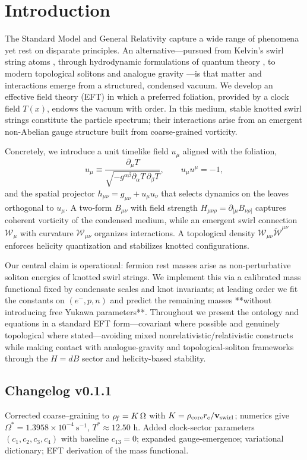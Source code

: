 \section{Introduction}

The Standard Model and General Relativity capture a wide range of phenomena yet rest on disparate principles. An alternative—pursued from Kelvin’s swirl string atoms \cite{Kelvin1867}, through hydrodynamic formulations of quantum theory \cite{Madelung1927}, to modern topological solitons and analogue gravity \cite{Faddeev1997,Arnold1998,Barcelo2011,Volovik2003,Kleckner2013}—is that matter and interactions emerge from a structured, condensed vacuum. We develop an effective field theory (EFT) in which a preferred foliation, provided by a clock field \(T(x)\), endows the vacuum with order. In this medium, stable knotted swirl strings constitute the particle spectrum; their interactions arise from an emergent non-Abelian gauge structure built from coarse-grained vorticity.

Concretely, we introduce a unit timelike field \(u_\mu\) aligned with the foliation,
\[
 u_\mu \equiv \frac{\partial_\mu T}{\sqrt{-g^{\alpha\beta}\partial_\alpha T\,\partial_\beta T}},
 \qquad u_\mu u^\mu = -1,
\]
and the spatial projector \(h_{\mu\nu}=g_{\mu\nu}+u_\mu u_\nu\) that selects dynamics on the leaves orthogonal to \(u_\mu\). A two-form \(B_{\mu\nu}\) with field strength \(H_{\mu\nu\rho}=\partial_{[\mu}B_{\nu\rho]}\) captures coherent vorticity of the condensed medium, while an emergent swirl connection \(\mathcal{W}_\mu\) with curvature \(\mathcal{W}_{\mu\nu}\) organizes interactions. A topological density \(\mathcal{W}_{\mu\nu}\tilde{\mathcal{W}}^{\mu\nu}\) enforces helicity quantization and stabilizes knotted configurations.

Our central claim is operational: fermion rest masses arise as non-perturbative soliton energies of knotted swirl strings. We implement this via a calibrated mass functional fixed by condensate scales and knot invariants; at leading order we fit the constants on \((e^-,p,n)\) and predict the remaining masses **without introducing free Yukawa parameters**. Throughout we present the ontology and equations in a standard EFT form—covariant where possible and genuinely topological where stated—avoiding mixed nonrelativistic/relativistic constructs while making contact with analogue-gravity and topological-soliton frameworks through the \(H=dB\) sector and helicity-based stability.

\subsection*{Changelog v0.1.1}
Corrected coarse--graining to $\rho_{\!f}=K\,\Omega$ with $K=\rho_{\mathrm{core}} r_c / \mathbf{v}_{\mathrm{swirl}}$; numerics give $\Omega^\ast=1.3958\times 10^{-4}\ \mathrm{s^{-1}}$, $T^\ast\approx 12.50$ h.
Added clock-sector parameters $(c_1,c_2,c_3,c_4)$ with baseline $c_{13}=0$; expanded gauge-emergence; variational dictionary; EFT derivation of the mass functional.
